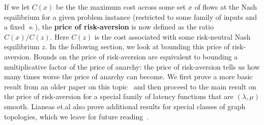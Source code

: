 If we let $C(x)$ be the the maximum cost across some set $x$ of flows at the Nash equilibrium for a given problem instance 
(restricted to some family of inputs and a fixed $\upkappa$), the {\textbf{price of risk-aversion}} is now defined as the
ratio $C(x)/C(z)$. Here $C(z)$ is the cost associated with some risk-neutral Nash equilibrium $z$. 
In the following section, we look at bounding this price of risk-aversion. 
Bounds on the price of risk-aversion are equivalent to bounding 
a multiplicative factor of the price of anarchy: the price of risk-aversion tells us how many times worse 
the price of anarchy can become.
We first prove a 
more basic result from an older paper on this topic~\cite{risk-averse-background} and then proceed to the main result on the price
of risk-aversion for 
a special family of latency functions that are $(\lambda, \mu)$ smooth. Lianeas et.al also prove additional results for special classes
of graph topologies, which we leave for future reading~\cite{risk-averse}.




